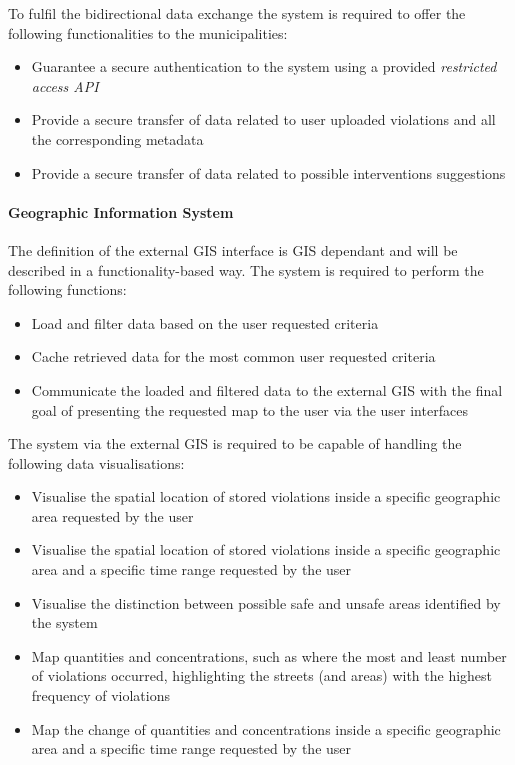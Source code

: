 	To fulfil the bidirectional data exchange the system is required to offer the following functionalities to the municipalities:
	
	\begin{itemize}
		\item Guarantee a secure authentication to the system using a provided \emph{restricted access API}
		\item Provide a secure transfer of data related to user uploaded violations and all the corresponding metadata
		\item Provide a secure transfer of data related to possible interventions suggestions 
		
	\end{itemize} 
	
\clearpage

\paragraph{Geographic Information System} \label{p:gis} The definition of the external GIS interface is GIS dependant and will be described in a functionality-based way. The system is required to perform the following functions:

	\begin{itemize}
		\item Load and filter data based on the user requested criteria
		\item Cache retrieved data for the most common user requested criteria
		\item Communicate the loaded and filtered data to the external GIS with the final goal of presenting the requested map to the user via the user interfaces
		
		\end{itemize}
	
	The system via the external GIS is required to be capable of handling the following data visualisations:
	
	\begin{itemize}
		\item Visualise the spatial location of stored violations inside a specific geographic area requested by the user
		\item Visualise the spatial location of stored violations inside a specific geographic area and a specific time range requested by the user
		\item Visualise the distinction between possible safe and unsafe areas identified by the system
		\item Map quantities and concentrations, such as where the most and least number of violations occurred, highlighting the streets (and areas) with the highest frequency of violations
		\item Map the change of quantities and concentrations inside a specific geographic area and a specific time range requested by the user \newline
	\end{itemize}


